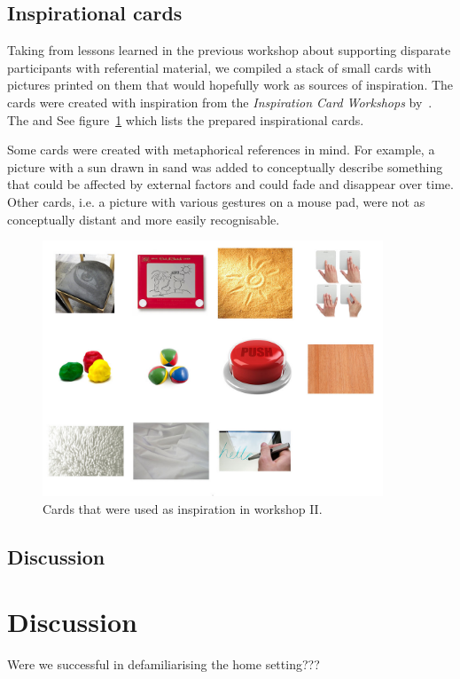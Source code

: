 \subsection{Inspirational cards}

Taking from lessons learned in the previous workshop about supporting disparate participants with referential material, we compiled a stack of small cards with pictures printed on them that would hopefully work as sources of inspiration.
The cards were created with inspiration from the \emph{Inspiration Card Workshops} by~\cite{halskov2006inspiration}.
The
and \todo{\dots}
See figure~\ref{ch:workshops:technology-cards} which lists the prepared inspirational cards.

Some cards were created with metaphorical references in mind.
For example, a picture with a sun drawn in sand was added to conceptually describe something that could be affected by external factors and could fade and disappear over time.
Other cards, i.e. a picture with various gestures on a mouse pad, were not as conceptually distant and more easily recognisable.

\begin{figure}[hb]
  \centering
    \includegraphics[width=4in]{workshops/technology-cards}
    \caption[A list of inspirational workshop cards.] %
  {Cards that were used as inspiration in workshop II.} %
  \label{ch:workshops:technology-cards}
\end{figure}

\subsection{Discussion}


\section{Discussion}

 Were we successful in defamiliarising the home setting???


